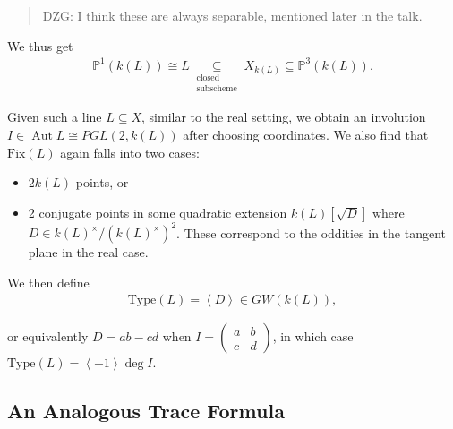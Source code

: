 \begin{quote}
DZG: I think these are always separable, mentioned later in the talk.
\end{quote}

We thus get
\begin{align*}
{\mathbb{P}}^1(k(L)) \cong L \underset{\substack{\text{closed}\\\text{subscheme}}}\subseteq X_{k(L)} \subseteq {\mathbb{P}}^3(k(L)).
\end{align*}

Given such a line \(L\subseteq X\), similar to the real setting, we
obtain an involution \(I \in {\operatorname{Aut}}L \cong PGL(2, k(L))\)
after choosing coordinates. We also find that \(\mathrm{Fix}(L)\) again
falls into two cases:

\begin{itemize}
\tightlist
\item
  \(2 k(L)\) points, or
\item
  2 conjugate points in some quadratic extension \(k(L)[\sqrt D]\) where
  \(D \in k(L)^\times / (k(L)^\times)^2\). These correspond to the
  oddities in the tangent plane in the real case.
\end{itemize}

We then define
\begin{align*}
\mathrm{Type}(L) = \left\langle{D}\right\rangle \in GW(k(L)),
\end{align*}

or equivalently \(D=ab-cd\) when
\(I = \begin{pmatrix}a&b\\c&d\end{pmatrix}\), in which case
\(\mathrm{Type}(L) = \left\langle{-1}\right\rangle \deg I\).

\hypertarget{an-analogous-trace-formula}{%
\subsection{An Analogous Trace
Formula}\label{an-analogous-trace-formula}}

